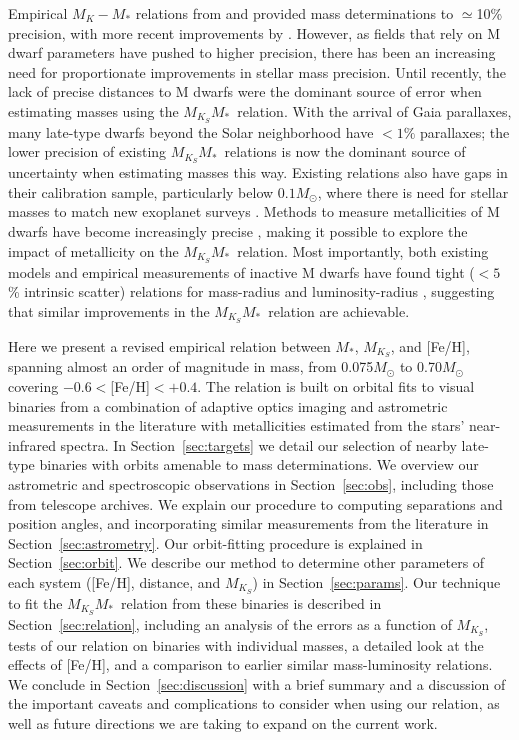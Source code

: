 \documentclass[twocolumn]{aastex62}
\newcommand{\mks}{$M_{K_S}$}
\newcommand{\mmk}{$M_{K_S}$\textendash$M_*$}
\begin{document}
Empirical $M_K-M_*$ relations from \citet{Hen1993} and \citet{Delfosse2000} provided mass determinations to $\simeq$10\% precision, with more recent improvements by \citet{Benedict2016}. However, as fields that rely on M dwarf parameters have pushed to higher precision, there has been an increasing need for proportionate improvements in stellar mass precision. Until recently, the lack of precise distances to M dwarfs were the dominant source of error when estimating masses using the \mmk\ relation. With the arrival of Gaia parallaxes, many late-type dwarfs beyond the Solar neighborhood have $<1\%$ parallaxes; the lower precision of existing \mmk\ relations is now the dominant source of uncertainty when estimating masses this way. Existing relations also have gaps in their calibration sample, particularly below $0.1M_\odot$, where there is need for stellar masses to match new exoplanet surveys \citep[e.g.,][]{Gillon2017}. Methods to measure metallicities of M dwarfs have become increasingly precise \citep[e.g.,][]{RojasAyala:2010, 2014A&A...568A.121N}, making it possible to explore the impact of metallicity on the \mmk\ relation. Most importantly, both existing models and empirical measurements of inactive M dwarfs have found tight ($<5$\% intrinsic scatter) relations for mass-radius \citep[e.g.,][]{Bayless2006,Spada2013,2017AJ....154..100H} and luminosity-radius \citep[e.g.,][]{Boyajian2012,2015ApJ...802L..10T,Mann2015b}, suggesting that similar improvements in the \mmk\ relation are achievable.

Here we present a revised empirical relation between $M_*$, $M_{K_S}$, and [Fe/H], spanning almost an order of magnitude in mass, from 0.075$M_\odot$ to 0.70$M_\odot$ covering $-0.6<$[Fe/H]$<+0.4$. The relation is built on orbital fits to visual binaries from a combination of adaptive optics imaging and astrometric measurements in the literature with metallicities estimated from the stars' near-infrared spectra. In Section~\ref{sec:targets} we detail our selection of nearby late-type binaries with orbits amenable to mass determinations. We overview our astrometric and spectroscopic observations in Section~\ref{sec:obs}, including those from telescope archives. We explain our procedure to computing separations and position angles, and incorporating similar measurements from the literature in Section~\ref{sec:astrometry}. Our orbit-fitting procedure is explained in Section~\ref{sec:orbit}. We describe our method to determine other parameters of each system ([Fe/H], distance, and \mks) in Section~\ref{sec:params}. Our technique to fit the \mmk\ relation from these binaries is described in Section~\ref{sec:relation}, including an analysis of the errors as a function of \mks, tests of our relation on binaries with individual masses, a detailed look at the effects of [Fe/H], and a comparison to earlier similar mass-luminosity relations. We conclude in Section~\ref{sec:discussion} with a brief summary and a discussion of the important caveats and complications to consider when using our relation, as well as future directions we are taking to expand on the current work.
\end{document}
